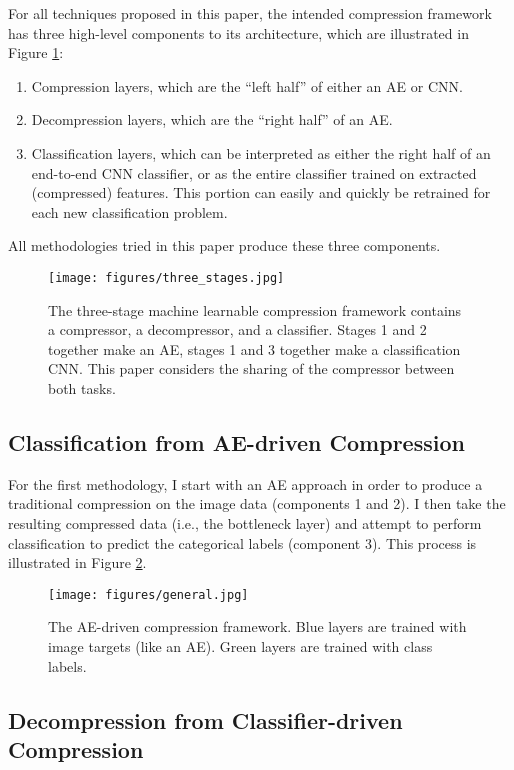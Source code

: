 \documentclass[twoside,11pt]{article}
\begin{document}
For all techniques proposed in this paper, the intended compression framework has
three high-level components to its architecture, which are
 illustrated in Figure \ref{fig:three_stages}:
\begin{enumerate}
    \item Compression layers, which are the ``left half'' of either an AE or CNN. 
    \item Decompression layers, which are the ``right half'' of an AE. 
    \item Classification layers, which can be interpreted as either the right half of
     an end-to-end CNN classifier, or as the entire classifier trained on extracted (compressed) features. This portion can easily and quickly be retrained for each new classification problem.
\end{enumerate}

All methodologies tried in this paper produce these three components.

\begin{figure}[h]
  \texttt{[image: figures/three\_stages.jpg]}
  \caption{The three-stage machine learnable compression framework contains a compressor, 
  a decompressor, and a classifier. Stages 1 and 2 together make an AE, stages 1 and 3 
  together make a classification CNN. This paper considers the sharing of the 
  compressor between both tasks. }
  \label{fig:three_stages}
\end{figure}

\subsection{Classification from AE-driven Compression} \label{general}

For the first methodology, I start with an AE approach in order 
to produce a traditional compression on the image data (components 1 and 2). 
I then take the resulting compressed data (i.e., the bottleneck layer) and attempt 
to perform classification
to predict the categorical labels (component 3).
This process is illustrated in Figure \ref{fig:general}.

\begin{figure}[h]
  \texttt{[image: figures/general.jpg]}
  \caption{The AE-driven compression framework. Blue layers are trained with image targets (like an AE).
  Green layers are trained with class labels.}
  \label{fig:general}
\end{figure}

\subsection{Decompression from Classifier-driven Compression} \label{special}
\end{document}
